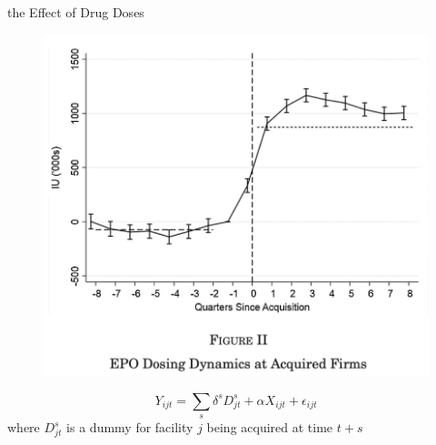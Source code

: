 \begin{frame}{the Effect of Drug Doses}
    \begin{figure}
        \centering
        \includegraphics[width=0.5\linewidth]{fig2.png}
    \end{figure}
    $$Y_{ijt}=\sum_s \delta^sD^s_{jt} +\alpha X_{ijt} +\epsilon_{ijt}$$
    where $D_{jt}^s$ is a dummy for facility $j$ being acquired at time $t+s$
\end{frame}